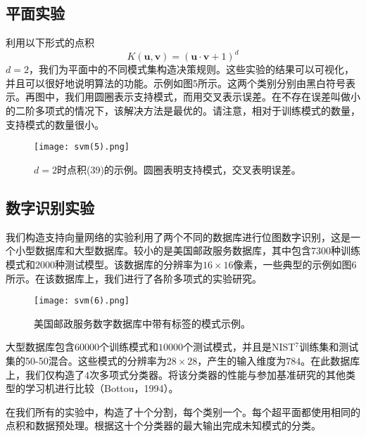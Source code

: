 \documentclass[lang=cn,11pt,a4paper]{elegantpaper}
\begin{document}
	\subsection{平面实验}
	利用以下形式的点积
	\begin{equation}
		K(\mathbf{u},\mathbf{v})=(\mathbf{u}·\mathbf{v}+1)^d \tag{39}
	\end{equation}
	$d=2$，我们为平面中的不同模式集构造决策规则。这些实验的结果可以可视化，并且可以很好地说明算法的功能。示例如图5所示。这两个类别分别由黑白符号表示。再图中，我们用圆圈表示支持模式，而用交叉表示误差。在不存在误差叫做小的二阶多项式的情况下，该解决方法是最优的。请注意，相对于训练模式的数量，支持模式的数量很小。
	\begin{figure}[htbp]
		\centering
		\texttt{[image: svm(5).png]}
		\caption{$d=2$时点积(39)的示例。圆圈表明支持模式，交叉表明误差。}
	\end{figure}

	\subsection{数字识别实验}
	我们构造支持向量网络的实验利用了两个不同的数据库进行位图数字识别，这是一个小型数据库和大型数据库。较小的是美国邮政服务数据库，其中包含$7300$种训练模式和$2000$种测试模型。该数据库的分辨率为$16\times16$像素，一些典型的示例如图6所示。在该数据库上，我们进行了各阶多项式的实验研究。
	\begin{figure}[htbp]
		\centering
		\texttt{[image: svm(6).png]}
		\caption{美国邮政服务数字数据库中带有标签的模式示例。}
	\end{figure}
	大型数据库包含$60000$个训练模式和$10000$个测试模式，并且是NIST$^7$训练集和测试集的50-50混合。这些模式的分辨率为$28\times28$，产生的输入维度为$784$。在此数据库上，我们仅构造了$4$次多项式分类器。将该分类器的性能与参加基准研究的其他类型的学习机进行比较（Bottou，1994）。

	在我们所有的实验中，构造了十个分割，每个类别一个。每个超平面都使用相同的点积和数据预处理。根据这十个分类器的最大输出完成未知模式的分类。
\end{document}
